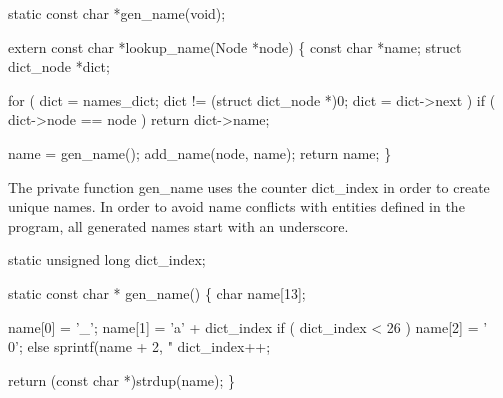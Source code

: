\nwendcode{}\nwdocspar
\nwenddocs{}\plusendmoddef\nwstartdeflinemarkup{}\nwenddeflinemarkup
static const char *gen_name(void);

extern const char *lookup_name(Node *node)
\{
    const char       *name;
    struct dict_node *dict;

    for ( dict = names_dict; dict != (struct dict_node *)0; dict = dict->next )
        if ( dict->node == node )
            return dict->name;

    name = gen_name();
    add_name(node, name);
    return name;
\}

\nwendcode{}\nwdocspar
The private function {\Tt{}gen{\_}name\nwendquote} uses the counter {\Tt{}dict{\_}index\nwendquote} in
order to create unique names. In order to avoid name conflicts with
entities defined in the program, all generated names start with an
underscore.



\nwenddocs{}\plusendmoddef\nwstartdeflinemarkup{}\nwenddeflinemarkup
static unsigned long dict_index;

static const char *
gen_name()
\{
    char name[13];

    name[0] = '_';
    name[1] = 'a' + dict_index %
    if ( dict_index < 26 )
        name[2] = '\\0';
    else
        sprintf(name + 2, "%
    dict_index++;

    return (const char *)strdup(name);
\}
\nwendcode{}

%
%

